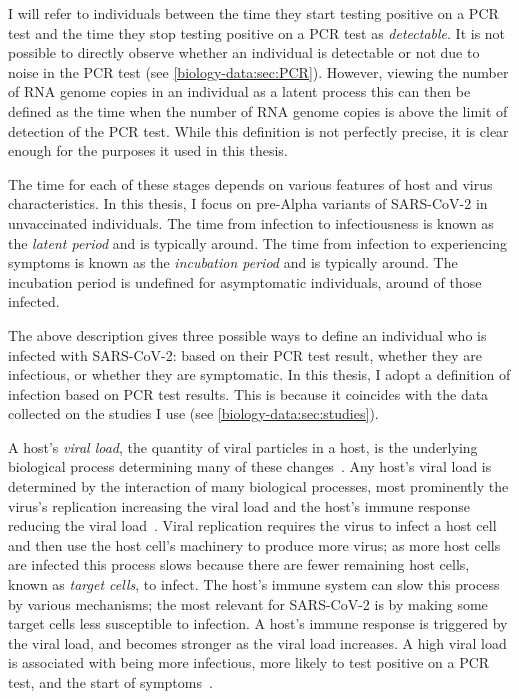\documentclass[thesis.tex]{subfiles}
\begin{document}
I will refer to individuals between the time they start testing positive on a PCR test and the time they stop testing positive on a PCR test as \emph{detectable}.
It is not possible to directly observe whether an individual is detectable or not due to noise in the PCR test (see \cref{biology-data:sec:PCR}).
However, viewing the number of RNA genome copies in an individual as a latent process this can then be defined as the time when the number of RNA genome copies is above the limit of detection of the PCR test.
While this definition is not perfectly precise, it is clear enough for the purposes it used in this thesis.

The time for each of these stages depends on various features of host and virus characteristics.
In this thesis, I focus on pre-Alpha variants of SARS-CoV-2 in unvaccinated individuals.
The time from infection to infectiousness is known as the \emph{latent period} and is typically around.
The time from infection to experiencing symptoms is known as the \emph{incubation period} and is typically around.
The incubation period is undefined for asymptomatic individuals, around of those infected.

The above description gives three possible ways to define an individual who is infected with SARS-CoV-2: based on their PCR test result, whether they are infectious, or whether they are symptomatic.
In this thesis, I adopt a definition of infection based on PCR test results.
This is because it coincides with the data collected on the studies I use (see \cref{biology-data:sec:studies}).

A host's \emph{viral load}, the quantity of viral particles in a host, is the underlying biological process determining many of these changes~\autocite{puhachSARSCoV2}.
Any host's viral load is determined by the interaction of many biological processes, most prominently the virus's replication increasing the viral load and the host's immune response reducing the viral load~\autocite{keVivo}.
Viral replication requires the virus to infect a host cell and then use the host cell's machinery to produce more virus; as more host cells are infected this process slows because there are fewer remaining host cells, known as \emph{target cells}, to infect.
The host's immune system can slow this process by various mechanisms; the most relevant for SARS-CoV-2 is by making some target cells less susceptible to infection.
A host's immune response is triggered by the viral load, and becomes stronger as the viral load increases.
A high viral load is associated with being more infectious, more likely to test positive on a PCR test, and the start of symptoms~\autocite{puhachSARSCoV2,keVivo}.
\end{document}
